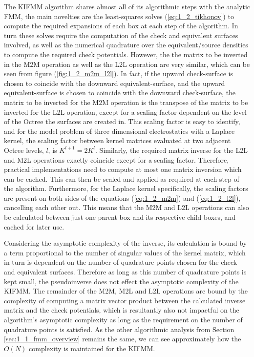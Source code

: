 The \gls{KIFMM} algorithm shares almost all of its algorithmic steps with the analytic \gls{FMM}, the
main novelties are the least-squares solves (\ref{eq:1_2_tikhonov}) to compute
the required expansions of each box at each step of the algorithm. In turn
these solves require the computation of the check and equivalent surfaces involved,
as well as the numerical quadrature over the equivalent/source densities to compute
the required check potentials. However, the the matrix to be inverted
in the \gls{M2M} operation as well as the \gls{L2L} operation are very similar, which can
be seen from figure (\ref{fig:1_2_m2m_l2l}). In fact, if
the upward \gls{check-surface} is chosen to coincide with the downward
\gls{equivalent-surface}, and the upward \gls{equivalent-surface} is chosen to
coincide with the downward \gls{check-surface}, the matrix to be inverted for the M2M
operation is the transpose of the matrix to be inverted for the \gls{L2L} operation,
except for a scaling factor dependent on the level of the Octree the surfaces
are created in. This scaling factor is easy to identify, and for the model problem of
three dimensional electrostatics with a Laplace kernel, the scaling factor between
kernel matrices evaluated at two adjacent Octree levels, $l$, is $K^{l+1} = 2K^l$.
Similarly, the required matrix inverse for the \gls{L2L} and \gls{M2L} operations exactly coincide
except for a scaling factor. Therefore, practical implementations
need to compute at most one matrix inversion which can be cached. This can then
be scaled and applied as required at each step of the algorithm. Furthermore,
for the Laplace kernel specifically, the scaling factors are present on both sides
of the equations (\ref{eq:1_2_m2m}) and (\ref{eq:1_2_l2l}), cancelling each other out.
This means that the \gls{M2M} and \gls{L2L} operations can also be calculated between just one
parent box and its respective child boxes, and cached for later use.

Considering the asymptotic complexity of the inverse, its calculation is bound
by a term proportional to the number of singular values of the kernel
matrix, which in turn is dependent on the number of quadrature points chosen for
the check and equivalent surfaces. Therefore as long as this number of quadrature
points is kept small, the pseudoinverse does not effect the asymptotic complexity
of the \gls{KIFMM}. The remainder of the \gls{M2M}, \gls{M2L} and \gls{L2L} operations are bound by
the complexity of computing a matrix vector product between the calculated inverse
matrix and the check potentials, which is resultantly also not impactful on the
algorithm's asymptotic complexity as long as the requirement on the number of
quadrature points is satisfied. As the other algorithmic analysis from
Section \ref{sec:1_1_fmm_overview} remains the same, we can see approximately how
the $O(N)$ complexity is maintained for the \gls{KIFMM}.

